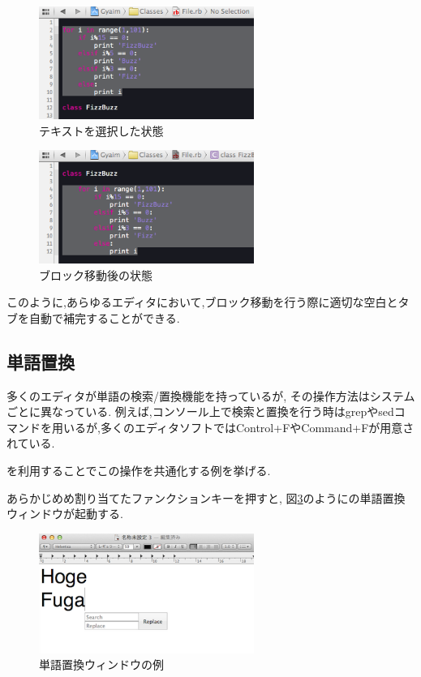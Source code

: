 \begin{figure}[H]
\centerline{\includegraphics[width=70mm,bb=0 0 360 190]{figures/indent2.png}}
\caption{テキストを選択した状態}
\label{indent2}
\end{figure}

\begin{figure}[H]
\centerline{\includegraphics[width=70mm,bb=0 0 360 190]{figures/indent3.png}}
\caption{ブロック移動後の状態}
\label{indent3}
\end{figure}

このように,あらゆるエディタにおいて,ブロック移動を行う際に適切な空白とタブを自動で補完することができる.

\subsection{単語置換}

多くのエディタが単語の検索/置換機能を持っているが,
その操作方法はシステムごとに異なっている.
例えば,コンソール上で検索と置換を行う時はgrepやsedコマンドを用いるが,多くのエディタソフトではControl+FやCommand+Fが用意されている.

{\system}を利用することでこの操作を共通化する例を挙げる.

あらかじめめ割り当てたファンクションキーを押すと,
図\ref{search1}のように{\system}の単語置換ウィンドウが起動する.

\begin{figure}[H]
\centerline{\includegraphics[width=70mm,bb=0 0 360 215]{figures/replace1.png}}
\caption{単語置換ウィンドウの例}
\label{search1}
\end{figure}

